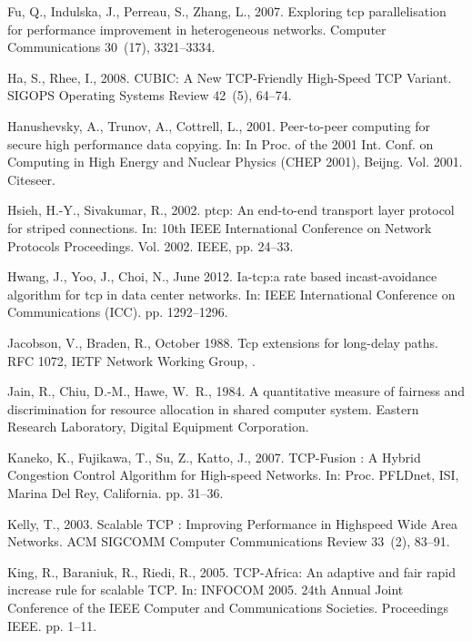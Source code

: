 \documentclass[preprint,3p,times,twocolumn,authoryear]{elsarticle}
\begin{document}
\begin{thebibliography}{46}
Fu, Q., Indulska, J., Perreau, S., Zhang, L., 2007. Exploring tcp
  parallelisation for performance improvement in heterogeneous networks.
  Computer Communications 30~(17), 3321--3334.

Ha, S., Rhee, I., 2008. {CUBIC: A New TCP-Friendly High-Speed TCP Variant}.
  SIGOPS Operating Systems Review 42~(5), 64--74.

Hanushevsky, A., Trunov, A., Cottrell, L., 2001. Peer-to-peer computing for
  secure high performance data copying. In: In Proc. of the 2001 Int. Conf. on
  Computing in High Energy and Nuclear Physics (CHEP 2001), Beijng. Vol. 2001.
  Citeseer.

Hsieh, H.-Y., Sivakumar, R., 2002. ptcp: An end-to-end transport layer protocol
  for striped connections. In: 10th IEEE International Conference on Network
  Protocols Proceedings. Vol. 2002. IEEE, pp. 24--33.

Hwang, J., Yoo, J., Choi, N., June 2012. Ia-tcp:a rate based incast-avoidance
  algorithm for tcp in data center networks. In: IEEE International Conference
  on Communications (ICC). pp. 1292--1296.

Jacobson, V., Braden, R., October 1988. Tcp extensions for long-delay paths.
  RFC 1072, IETF Network Working Group, .

Jain, R., Chiu, D.-M., Hawe, W.~R., 1984. A quantitative measure of fairness
  and discrimination for resource allocation in shared computer system. Eastern
  Research Laboratory, Digital Equipment Corporation.

Kaneko, K., Fujikawa, T., Su, Z., Katto, J., 2007. {TCP-Fusion : A Hybrid
  Congestion Control Algorithm for High-speed Networks}. In: Proc. PFLDnet,
  ISI, Marina Del Rey, California. pp. 31--36.

Kelly, T., 2003. {Scalable TCP : Improving Performance in Highspeed Wide Area
  Networks}. ACM SIGCOMM Computer Communications Review 33~(2), 83--91.

King, R., Baraniuk, R., Riedi, R., 2005. {TCP-Africa: An adaptive and fair
  rapid increase rule for scalable TCP}. In: INFOCOM 2005. 24th Annual Joint
  Conference of the IEEE Computer and Communications Societies. Proceedings
  IEEE. pp. 1--11.


\end{thebibliography}
\end{document}
